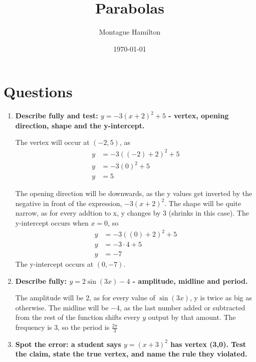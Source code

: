 \documentclass{article}
\begin{document}
\title{Parabolas}
\author{Montague Hamilton}
\date{\today}
\maketitle

\section{Questions}
\begin{enumerate}[itemsep=12pt]
  \item \textbf{Describe fully and test: $y = -3(x + 2)^{2} + 5$ - vertex, opening direction, shape and the y-intercept.}

    The vertex will occur at $(-2, 5)$, as
    \begin{align*}
      y &= -3((-2) + 2)^{2} + 5 \\
      y &= -3(0)^{2} + 5 \\
      y &= 5
    \end{align*}
    
    The opening direction will be downwards, as the y values get inverted by the negative in front of the expression, $-3(x+2)^{2}$.
    The shape will be quite narrow, as for every addtion to x, y changes by 3 (shrinks in this case).
    The y-intercept occurs when $x = 0$, so
    \begin{align*}
      y &= -3((0) + 2)^{2} + 5 \\
      y &= -3 \cdot 4 + 5 \\
      y &= -7
    \end{align*}
    The y-intercept occurs at $(0,-7)$.

  \item \textbf{Describe fully: $y = 2\sin(3x) -4$ - amplitude, midline and period.}

    The amplitude will be $2$, as for every value of $\sin(3x)$, y is twice as big as otherwise. The midline will be $-4$,
    as the last number added or subtracted from the rest of the function shifts every $y$ output by that amount. 
    The frequency is 3, so the period is $\frac{2\pi}{3}$
    
    \newpage
  \item \textbf{Spot the error: a student says $y = (x + 3)^{2}$ has vertex (3,0). 
    Test the claim, state the true vertex, and name the rule they violated.} 


\end{enumerate}
\end{document}

